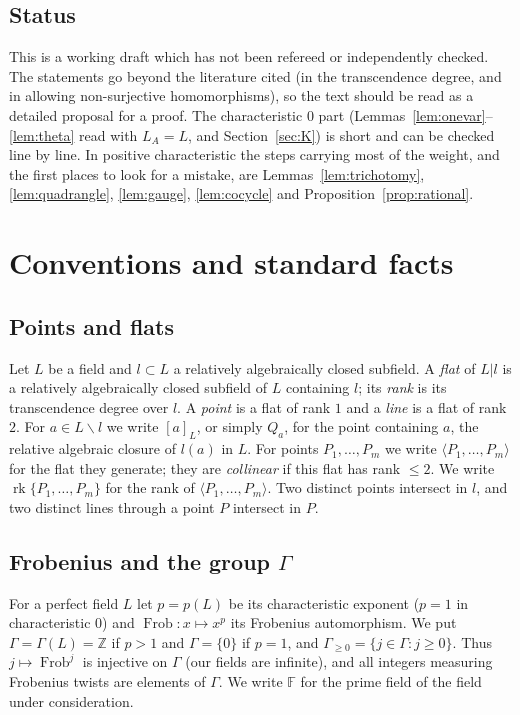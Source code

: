 \documentclass[11pt]{amsart}
\theoremstyle{definition}
\theoremstyle{remark}
\newcommand{\ZZ}{\mathbb{Z}}
\newcommand{\FF}{\mathbb{F}}
\newcommand{\rk}{\operatorname{rk}}
\newcommand{\Frob}{\operatorname{Frob}}
\newcommand{\sm}{\smallsetminus}
\newcommand{\la}{\langle}
\newcommand{\ra}{\rangle}
\begin{document}
\subsection{Status}
This is a working draft which has not been refereed or independently checked. The statements go beyond the literature cited (in the transcendence degree, and in allowing non-surjective homomorphisms), so the text should be read as a detailed proposal for a proof.
The characteristic $0$ part (Lemmas~\ref{lem:onevar}--\ref{lem:theta} read with $L_A=L$, and Section~\ref{sec:K}) is short and can be checked line by line. In positive characteristic the steps carrying most of the weight, and the first places to look for a mistake, are Lemmas~\ref{lem:trichotomy}, \ref{lem:quadrangle}, \ref{lem:gauge}, \ref{lem:cocycle} and Proposition~\ref{prop:rational}.

\section{Conventions and standard facts}\label{sec:conv}

\subsection{Points and flats}
Let $L$ be a field and $l\subset L$ a relatively algebraically closed subfield. A \emph{flat} of $L|l$ is a relatively algebraically closed subfield of $L$ containing $l$; its \emph{rank} is its transcendence degree over $l$.
A \emph{point} is a flat of rank $1$ and a \emph{line} is a flat of rank $2$. For $a\in L\sm l$ we write $[a]_L$, or simply $Q_a$, for the point containing $a$, the relative algebraic closure of $l(a)$ in $L$.
For points $P_1,\dots,P_m$ we write $\la P_1,\dots,P_m\ra$ for the flat they generate; they are \emph{collinear} if this flat has rank $\le2$. We write $\rk\{P_1,\dots,P_m\}$ for the rank of $\la P_1,\dots,P_m\ra$.
Two distinct points intersect in $l$, and two distinct lines through a point $P$ intersect in $P$.

\subsection{Frobenius and the group \texorpdfstring{$\Gamma$}{Gamma}}
For a perfect field $L$ let $p=p(L)$ be its characteristic exponent ($p=1$ in characteristic $0$) and $\Frob\colon x\mapsto x^p$ its Frobenius automorphism. We put $\Gamma=\Gamma(L)=\ZZ$ if $p>1$ and $\Gamma=\{0\}$ if $p=1$,
and $\Gamma_{\ge0}=\{j\in\Gamma:j\ge0\}$. Thus $j\mapsto\Frob^j$ is injective on $\Gamma$ (our fields are infinite), and all integers measuring Frobenius twists are elements of $\Gamma$.
We write $\FF$ for the prime field of the field under consideration.
\end{document}
